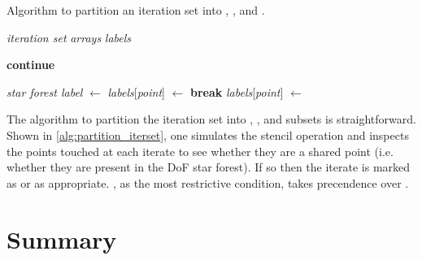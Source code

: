 \documentclass[thesis]{subfiles}
\begin{document}
\begin{algorithm}
  \caption{
    Algorithm to partition an iteration set into \coreiter{}, \rootiter{}, and \leafiter{}.
  }
  \begin{algorithmic}[1]
    \Require \textit{iteration set}
    \Require \textit{arrays} 
    \Require \textit{labels} 

       
         
          \State \textbf{continue}
        \EndIf

            \State \textit{star forest label} $\gets$ 
              \State \textit{labels}[\textit{point}] $\gets$ \leafiter{}
              \State \textbf{break} 
            \Else
              \State \textit{labels}[\textit{point}] $\gets$ \rootiter{}
            \EndIf
          \EndIf
        \EndFor
      \EndFor
    \EndFor
  \end{algorithmic}
  \label{alg:partition_iterset}
\end{algorithm}

The algorithm to partition the iteration set into \coreiter{}, \rootiter{}, and \leafiter{} subsets is straightforward.
Shown in \cref{alg:partition_iterset}, one simulates the stencil operation and inspects the points touched at each iterate to see whether they are a shared point (i.e. whether they are present in the DoF star forest).
If so then the iterate is marked as \rootiter{} or \leafiter{} as appropriate.
\leafiter{}, as the most restrictive condition, takes precendence over \rootiter{}.

\section{Summary}

\end{document}
